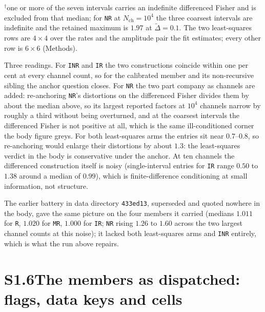 \documentclass[11pt]{article}
\begin{document}
$^{\dagger}$one or more of the seven intervals carries an indefinite differenced Fisher and is
excluded from that median; for \texttt{NR} at $N_{\mathrm{ch}}=10^{4}$ the three coarsest
intervals are indefinite and the retained maximum is $1.97$ at $\widetilde{\Delta}=0.1$. The two
least-squares rows are $4\times4$ over the rates and the amplitude pair the fit estimates; every
other row is $6\times6$ (Methods).

Three readings. For \texttt{INR} and \texttt{IR} the two constructions coincide within one per
cent at every channel count, so for the calibrated member and its non-recursive sibling the
anchor question closes. For \texttt{NR} the two part company as channels are added: re-anchoring
\texttt{NR}'s distortions on the differenced Fisher divides them by about the median above, so
its largest reported factors at $10^{4}$ channels narrow by roughly a third without being
overturned, and at the coarsest intervals the differenced Fisher is not positive at all, which is
the same ill-conditioned corner the body figure greys. For both least-squares arms the entries
sit near $0.7$--$0.8$, so re-anchoring would enlarge their distortions by about $1.3$: the
least-squares verdict in the body is conservative under the anchor. At ten channels the
differenced construction itself is noisy (single-interval entries for \texttt{IR} range $0.50$
to $1.38$ around a median of $0.99$), which is finite-difference conditioning at small
information, not structure.

The earlier battery in data directory \texttt{433ed13}, superseded and quoted nowhere in the
body, gave the same picture on the four members it carried (medians $1.011$ for \texttt{R},
$1.020$ for \texttt{MR}, $1.000$ for \texttt{IR}; \texttt{NR} rising $1.26$ to $1.60$ across the
two largest channel counts at this noise); it lacked both least-squares arms and \texttt{INR}
entirely, which is what the run above repairs.


\section*{S1.6\quad The members as dispatched: flags, data keys and cells}

\end{document}

